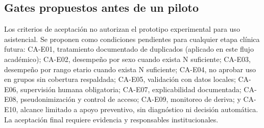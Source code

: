 \subsection{Gates propuestos antes de un piloto}

Los criterios de aceptación no autorizan el prototipo experimental para uso asistencial. Se proponen como condiciones pendientes para cualquier etapa clínica futura: CA-E01, tratamiento documentado de duplicados (aplicado en este flujo académico); CA-E02, desempeño por sexo cuando exista N suficiente; CA-E03, desempeño por rango etario cuando exista N suficiente; CA-E04, no aprobar uso en grupos sin cobertura respaldada; CA-E05, validación con datos locales; CA-E06, supervisión humana obligatoria; CA-E07, explicabilidad documentada; CA-E08, pseudonimización y control de acceso; CA-E09, monitoreo de deriva; y CA-E10, alcance limitado a apoyo preventivo, sin diagnóstico ni decisión automática. La aceptación final requiere evidencia y responsables institucionales.
